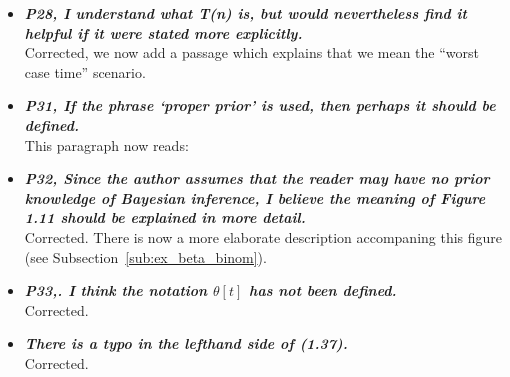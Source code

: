 \documentclass[english]{article}
\begin{document}
\begin{itemize}
\item {
{\it
\textbf{
P28, I understand what T(n) is, but would nevertheless find it helpful if it were stated more explicitly.
}%
}%
}%
\\
Corrected, we now add a passage which explains that we mean the ``worst case time'' scenario.


\item {
{\it
\textbf{
P31, If the phrase `proper prior' is used, then perhaps it should be defined.
}%
}%
}%
\\
This paragraph now reads:

\begin{quote}
\myeditsvnine
\end{quote}


\item {
{\it
\textbf{
P32, Since the author assumes that the reader may have no prior knowledge of Bayesian inference, I believe the meaning of Figure 1.11 should be explained in more detail.
}%
}%
}%
\\
Corrected. There is now a more elaborate description accompaning this figure (see Subsection~\ref{sub:ex_beta_binom}).



\item {
{\it
\textbf{
P33,. I think the notation $\theta[t]$ has not been defined.
}%
}%
}%
\\
Corrected.




\item {
{\it
\textbf{
There is a typo in the lefthand side of (1.37).
}%
}%
}%
\\
Corrected.



\end{itemize}
\end{document}
